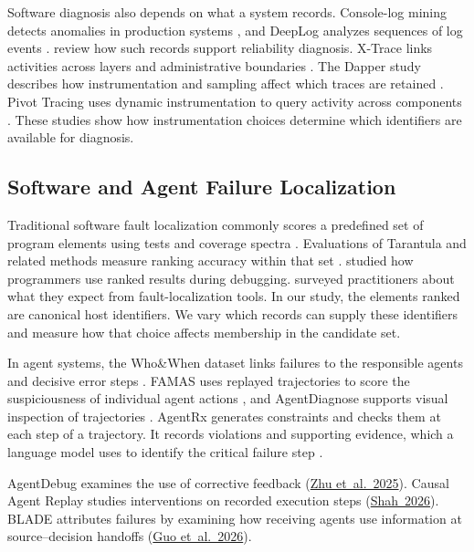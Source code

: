 \documentclass[sn-basic]{sn-jnl}%
\theoremstyle{thmstyleone}%
\theoremstyle{thmstyletwo}%
\theoremstyle{thmstylethree}%
\begin{document}
Software diagnosis also depends on what a system records. Console-log mining detects anomalies in production systems \citep{xu2009}, and DeepLog analyzes sequences of log events \citep{deeplog2017}. \citet{he2022} review how such records support reliability diagnosis. X-Trace links activities across layers and administrative boundaries \citep{xtrace2007}. The Dapper study describes how instrumentation and sampling affect which traces are retained \citep{sigelman2010dapper}. Pivot Tracing uses dynamic instrumentation to query activity across components \citep{mace2018pivot}. These studies show how instrumentation choices determine which identifiers are available for diagnosis.

\subsection{Software and Agent Failure Localization}\label{sec:failure-localization}

Traditional software fault localization commonly scores a predefined set of program elements using tests and coverage spectra \citep{wong2016flsurvey}. Evaluations of Tarantula and related methods measure ranking accuracy within that set \citep{abreu2007,jones2005}. \citet{parnin2011} studied how programmers use ranked results during debugging. \citet{kochhar2016} surveyed practitioners about what they expect from fault-localization tools. In our study, the elements ranked are canonical host identifiers. We vary which records can supply these identifiers and measure how that choice affects membership in the candidate set.

In agent systems, the Who\&When dataset links failures to the responsible agents and decisive error steps \citep{whowhen2025}. FAMAS uses replayed trajectories to score the suspiciousness of individual agent actions \citep{famas}, and AgentDiagnose supports visual inspection of trajectories \citep{agentdiagnose2025}. AgentRx generates constraints and checks them at each step of a trajectory. It records violations and supporting evidence, which a language model uses to identify the critical failure step \citep{agentrxreal}.

AgentDebug examines the use of corrective feedback (\href{https://arxiv.org/abs/2509.25370v1}{Zhu et~al.~2025}). Causal Agent Replay studies interventions on recorded execution steps (\href{https://arxiv.org/abs/2606.08275v1}{Shah~2026}). BLADE attributes failures by examining how receiving agents use information at source--decision handoffs (\href{https://arxiv.org/abs/2610.18780v1}{Guo et~al.~2026}).
\end{document}
